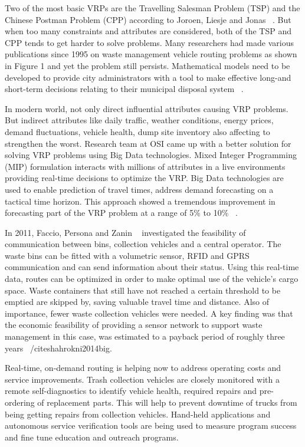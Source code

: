 \documentclass[sigconf]{acmart}
\begin{document}
Two of the most basic VRPs are the Travelling Salesman Problem (TSP) and the Chinese Postman Problem (CPP) according to Joroen, Liesje and Jonas ~\cite{Beliën2012}. But when too many constraints and attributes are considered, both of the TSP and CPP tends to get harder to solve problems. Many researchers had made various publications since 1995 on waste management vehicle routing problems as shown in Figure 1 and yet the problem still persists. Mathematical models need to be developed to provide city administrators with a tool to make effective long-and short-term decisions relating to their municipal disposal system ~\cite{Bhat1996}. 

In modern world, not only direct influential attributes causing VRP problems. But indirect attributes like daily traffic, weather conditions, energy prices, demand fluctuations, vehicle health, dump site inventory also affecting to strengthen the worst. Research team at OSI came up with a better solution for solving VRP problems using Big Data technologies. Mixed Integer Programming (MIP) formulation interacts with millions of attributes in a live environments providing real-time decisions to optimize the VRP. Big Data technologies are used to enable prediction of travel times, address demand forecasting on a tactical time horizon. This approach showed a tremendous improvement in forecasting part of the VRP problem at a range of 5\% to 10\% ~\cite{vijay2013}.

In 2011, Faccio, Persona and Zanin ~\cite{faccio2011} investigated the feasibility of communication between bins, collection vehicles and a central operator. The waste bins can be fitted with a volumetric sensor, RFID and GPRS communication and can send information about their status. Using this real-time data, routes can be optimized in order to make optimal use of the vehicle's cargo space. Waste containers that still have not reached a certain threshold to be emptied are skipped by, saving valuable travel time and distance. Also of importance, fewer waste collection vehicles were needed. A key ﬁnding was that the economic feasibility of providing a sensor network to support waste management in this case, was estimated to a payback period of roughly three years ~/cite{shahrokni2014big}.

Real-time, on-demand routing is helping now to address operating costs and service improvements. Trash collection vehicles are closely monitored with a remote self-diagnostics to identify vehicle health, required repairs and pre-ordering of replacement parts. This will help to prevent downtime of trucks from being getting repairs from collection vehicles. Hand-held applications and autonomous service verification tools are being used to measure program success and fine tune education and outreach programs.
\end{document}
